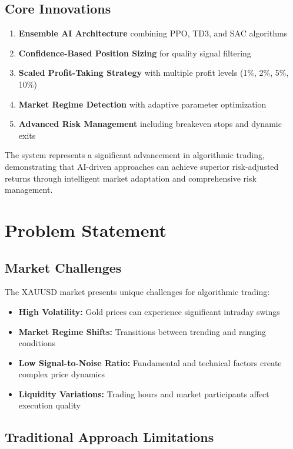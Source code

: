 \documentclass[11pt,a4paper]{article}
\begin{document}
\subsection{Core Innovations}

\begin{enumerate}
    \item \textbf{Ensemble AI Architecture} combining PPO, TD3, and SAC algorithms
    \item \textbf{Confidence-Based Position Sizing} for quality signal filtering
    \item \textbf{Scaled Profit-Taking Strategy} with multiple profit levels (1\%, 2\%, 5\%, 10\%)
    \item \textbf{Market Regime Detection} with adaptive parameter optimization
    \item \textbf{Advanced Risk Management} including breakeven stops and dynamic exits
\end{enumerate}

The system represents a significant advancement in algorithmic trading, demonstrating that AI-driven approaches can achieve superior risk-adjusted returns through intelligent market adaptation and comprehensive risk management.

\section{Problem Statement}

\subsection{Market Challenges}

The XAUUSD market presents unique challenges for algorithmic trading:

\begin{itemize}
    \item \textbf{High Volatility:} Gold prices can experience significant intraday swings
    \item \textbf{Market Regime Shifts:} Transitions between trending and ranging conditions
    \item \textbf{Low Signal-to-Noise Ratio:} Fundamental and technical factors create complex price dynamics
    \item \textbf{Liquidity Variations:} Trading hours and market participants affect execution quality
\end{itemize}

\subsection{Traditional Approach Limitations}
\end{document}
